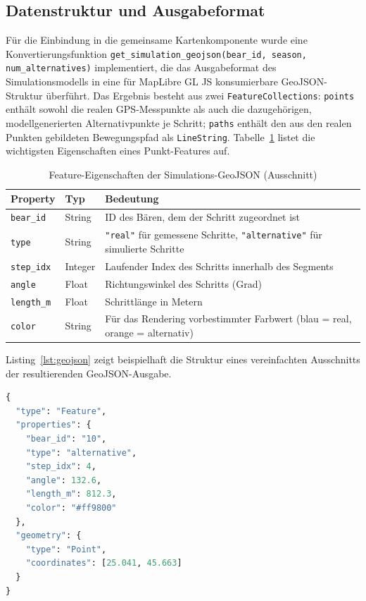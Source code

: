 \documentclass[12pt,a4paper]{report}
\begin{document}
\subsection{Datenstruktur und Ausgabeformat}

Für die Einbindung in die gemeinsame Kartenkomponente wurde eine Konvertierungsfunktion \texttt{get\_simulation\_geojson(bear\_id, season, num\_alternatives)} implementiert, die das Ausgabeformat des Simulationsmodells in eine für MapLibre GL JS konsumierbare GeoJSON-Struktur überführt. Das Ergebnis besteht aus zwei \texttt{FeatureCollections}: \texttt{points} enthält sowohl die realen GPS-Messpunkte als auch die dazugehörigen, modellgenerierten Alternativpunkte je Schritt; \texttt{paths} enthält den aus den realen Punkten gebildeten Bewegungspfad als \texttt{LineString}. Tabelle~\ref{tab:geojson-schema} listet die wichtigsten Eigenschaften eines Punkt-Features auf.

\begin{table}[h!]
\centering
\caption{Feature-Eigenschaften der Simulations-GeoJSON (Ausschnitt)}
\label{tab:geojson-schema}
\begin{tabular}{p{3cm}p{3.5cm}p{7cm}}
\toprule
\textbf{Property} & \textbf{Typ} & \textbf{Bedeutung} \\
\midrule
\texttt{bear\_id} & String & ID des Bären, dem der Schritt zugeordnet ist \\
\texttt{type} & String & \texttt{"real"} für gemessene Schritte, \texttt{"alternative"} für simulierte Schritte \\
\texttt{step\_idx} & Integer & Laufender Index des Schritts innerhalb des Segments \\
\texttt{angle} & Float & Richtungswinkel des Schritts (Grad) \\
\texttt{length\_m} & Float & Schrittlänge in Metern \\
\texttt{color} & String & Für das Rendering vorbestimmter Farbwert (blau = real, orange = alternativ) \\
\bottomrule
\end{tabular}
\end{table}

Listing~\ref{lst:geojson} zeigt beispielhaft die Struktur eines vereinfachten Ausschnitts der resultierenden GeoJSON-Ausgabe.

\begin{lstlisting}[language=Python, caption={Vereinfachtes Beispiel eines Punkt-Features der Simulations-GeoJSON}, label={lst:geojson}]
{
  "type": "Feature",
  "properties": {
    "bear_id": "10",
    "type": "alternative",
    "step_idx": 4,
    "angle": 132.6,
    "length_m": 812.3,
    "color": "#ff9800"
  },
  "geometry": {
    "type": "Point",
    "coordinates": [25.041, 45.663]
  }
}
\end{lstlisting}
\end{document}
